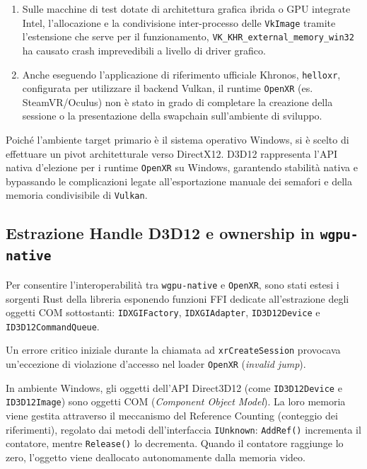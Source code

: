 \documentclass[a4paper, 11pt, twoside]{report}
\begin{document}
\begin{enumerate}
    \item Sulle macchine di test dotate di architettura grafica ibrida o GPU integrate Intel, l'allocazione e la
        condivisione inter-processo delle \texttt{VkImage} tramite l'estensione che serve per il funzionamento,
        \texttt{VK\_KHR\_external\_memory\_win32} ha causato crash imprevedibili a livello di driver grafico.
    \item Anche eseguendo l'applicazione di riferimento ufficiale Khronos, \texttt{helloxr}, configurata per utilizzare
        il backend \gls{Vulkan}, il runtime \texttt{\gls{OpenXR}} (es. SteamVR/Oculus) non è stato in grado di
        completare la creazione della sessione o la presentazione della swapchain sull'ambiente di sviluppo.
\end{enumerate}

Poiché l'ambiente target primario è il sistema operativo Windows, si è scelto di effettuare un pivot architetturale
verso DirectX12. D3D12 rappresenta l'API nativa d'elezione per i runtime \texttt{\gls{OpenXR}} su Windows, garantendo
stabilità nativa e bypassando le complicazioni legate all'esportazione manuale dei semafori e della memoria
condivisibile di \texttt{\gls{Vulkan}}.

\subsection{Estrazione Handle D3D12 e ownership in \texttt{wgpu-native}}

Per consentire l'interoperabilità tra \texttt{wgpu-native} e \texttt{\gls{OpenXR}}, sono stati estesi i sorgenti Rust
della libreria esponendo funzioni FFI dedicate all'estrazione degli oggetti COM sottostanti: \texttt{IDXGIFactory},
\texttt{IDXGIAdapter}, \texttt{ID3D12Device} e \texttt{ID3D12CommandQueue}.

Un errore critico iniziale durante la chiamata ad \texttt{xrCreateSession} provocava un'eccezione di violazione
d'accesso nel loader \texttt{\gls{OpenXR}} (\textit{invalid jump}).

In ambiente Windows, gli oggetti dell'API Direct3D12 (come \texttt{ID3D12Device} e \texttt{ID3D12Image}) sono 
oggetti COM (\textit{Component Object Model}). La loro memoria viene gestita attraverso il meccanismo del Reference
Counting (conteggio dei riferimenti), regolato dai metodi dell'interfaccia \texttt{IUnknown}: \texttt{AddRef()}
incrementa il contatore, mentre \texttt{Release()} lo decrementa. Quando il contatore raggiunge lo zero, l'oggetto viene
deallocato autonomamente dalla memoria video.
\end{document}
